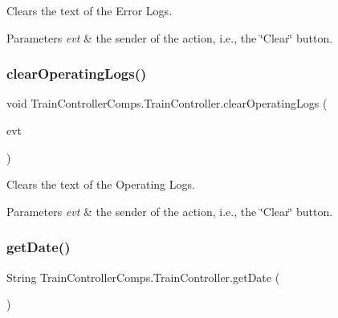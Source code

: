Clears the text of the Error Logs. 


\begin{DoxyParams}{Parameters}
{\em evt} & the sender of the action, i.\+e., the \char`\"{}\+Clear\char`\"{} button. \\
\hline
\end{DoxyParams}
\mbox{\label{classTrainControllerComps_1_1TrainController_abd14bbac0df7bd4207a2cdf76854802c}} 
\subsubsection{\texorpdfstring{clear\+Operating\+Logs()}{clearOperatingLogs()}}
{\footnotesize\ttfamily void Train\+Controller\+Comps.\+Train\+Controller.\+clear\+Operating\+Logs (\begin{DoxyParamCaption}\item[{java.\+awt.\+event.\+Action\+Event}]{evt }\end{DoxyParamCaption})\hspace{0.3cm}{\ttfamily [private]}}



Clears the text of the Operating Logs. 


\begin{DoxyParams}{Parameters}
{\em evt} & the sender of the action, i.\+e., the \char`\"{}\+Clear\char`\"{} button. \\
\hline
\end{DoxyParams}
\mbox{\label{classTrainControllerComps_1_1TrainController_a271b08d280e582a223b242674bca995f}} 
\subsubsection{\texorpdfstring{get\+Date()}{getDate()}}
{\footnotesize\ttfamily String Train\+Controller\+Comps.\+Train\+Controller.\+get\+Date (\begin{DoxyParamCaption}{ }\end{DoxyParamCaption})\hspace{0.3cm}{\ttfamily [private]}}



